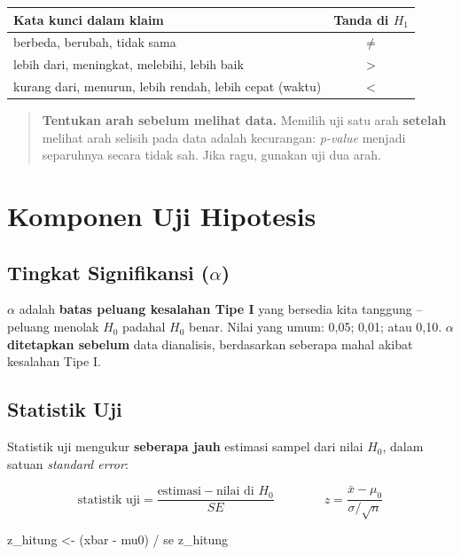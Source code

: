 \documentclass[
  indonesian,
  letterpaper,
]{book}
\newenvironment{Shaded}{\begin{snugshade}}{\end{snugshade}}
\newcommand{\NormalTok}[1]{\textcolor[rgb]{0.00,0.23,0.31}{#1}}
\newcommand{\OtherTok}[1]{\textcolor[rgb]{0.00,0.23,0.31}{#1}}
\newcommand{\SpecialCharTok}[1]{\textcolor[rgb]{0.37,0.37,0.37}{#1}}
\newcounter{none} %
\begin{document}
{\def\LTcaptype{none} %
\begin{longtable}[]{@{}lc@{}}
\toprule\noalign{}
Kata kunci dalam klaim & Tanda di \(H_1\) \\
\midrule\noalign{}
\endhead
\bottomrule\noalign{}
\endlastfoot
berbeda, berubah, tidak sama & \(\ne\) \\
lebih dari, meningkat, melebihi, lebih baik & \(>\) \\
kurang dari, menurun, lebih rendah, lebih cepat (waktu) & \(<\) \\
\end{longtable}
}

\begin{quote}
\textbf{Tentukan arah sebelum melihat data.} Memilih uji satu arah
\textbf{setelah} melihat arah selisih pada data adalah kecurangan:
\emph{p-value} menjadi separuhnya secara tidak sah. Jika ragu, gunakan
uji dua arah.
\end{quote}

\section{Komponen Uji Hipotesis}\label{komponen-uji-hipotesis}

\subsection{\texorpdfstring{Tingkat Signifikansi
(\(\alpha\))}{Tingkat Signifikansi (\textbackslash alpha)}}\label{tingkat-signifikansi-alpha}

\(\alpha\) adalah \textbf{batas peluang kesalahan Tipe I} yang bersedia
kita tanggung -- peluang menolak \(H_0\) padahal \(H_0\) benar. Nilai
yang umum: 0,05; 0,01; atau 0,10. \(\alpha\) \textbf{ditetapkan sebelum}
data dianalisis, berdasarkan seberapa mahal akibat kesalahan Tipe I.

\subsection{Statistik Uji}\label{statistik-uji}

Statistik uji mengukur \textbf{seberapa jauh} estimasi sampel dari nilai
\(H_0\), dalam satuan \emph{standard error}:

\[\text{statistik uji} = \frac{\text{estimasi} - \text{nilai di } H_0}{SE} \qquad\qquad z = \frac{\bar{x} - \mu_0}{\sigma/\sqrt{n}}\]

\begin{Shaded}
\begin{Highlighting}[]
\NormalTok{z\_hitung }\OtherTok{\textless{}{-}}\NormalTok{ (xbar }\SpecialCharTok{{-}}\NormalTok{ mu0) }\SpecialCharTok{/}\NormalTok{ se}
\NormalTok{z\_hitung}
\end{Highlighting}
\end{Shaded}
\end{document}
